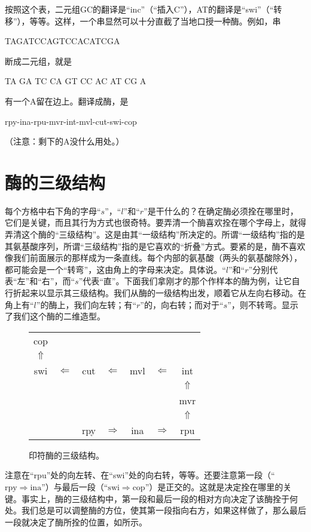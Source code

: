 按照这个表，二元组GC的翻译是“inc”（“插入C”），AT的翻译是“swi”（“转移”），等等。这样，一个串显然可以十分直截了当地口授一种酶。例如，串
\begin{center}
TAGATCCAGTCCACATCGA
\end{center}
断成二元组，就是
\begin{center}
TA GA TC CA GT CC AC AT CG A
\end{center}
有一个A留在边上。翻译成酶，是
\begin{center}
rpy-ina-rpu-mvr-int-mvl-cut-swi-cop
\end{center}
（注意：剩下的A没什么用处。）

\section{酶的三级结构}

每个方格中右下角的字母“$s$”，“$l$”和“$r$”是干什么的？在确定酶必须拴在哪里时，它们是关键，而且其行为方式也很奇特。要弄清一个酶喜欢拴在哪个字母上，就得弄清这个酶的“三级结构”。这是由其“一级结构”所决定的。所谓“一级结构”指的是其氨基酸序列，所谓“三级结构”指的是它喜欢的“折叠”方式。要紧的是，酶不喜欢像我们前面展示的那样成为一条直线。每个内部的氨基酸（两头的氨基酸除外），都可能会是一个“转弯”，这由角上的字母来决定。具体说。“$l$”和“$r$”分别代表“左”和“右”，而“$s$”代表“直”。下面我们拿刚才的那个作样本的酶为例，让它自行折起来以显示其三级结构。我们从酶的一级结构出发，顺着它从左向右移动。在角上有“$l$”的酶上，我们向左转；有“$r$”的，向右转；而对于“$s$”，则不转弯。显示了我们这个酶的二维造型。

\begin{figure}
\begin{tabular}{*7c}
cop\\
$\Uparrow$\\
swi & $\Leftarrow$ & cut & $\Leftarrow$ & mvl & $\Leftarrow$ & int\\
&&&&&& $\Uparrow$ \\
&&&&&& mvr \\
&&&&&& $\Uparrow$ \\
&& rpy & $\Rightarrow$ & ina & $\Rightarrow$ & rpu
\end{tabular}
\caption{印符酶的三级结构。}
\end{figure}

注意在“rpu”处的向左转、在“swi”处的向右转，等等。还要注意第一段（“$\mathrm{rpy}\Rightarrow\mathrm{ina}$”）与最后一段（“$\mathrm{swi}\Rightarrow\mathrm{cop}$”）是正交的。这就是决定拴在哪里的关键。事实上，酶的三级结构中，第一段和最后一段的相对方向决定了该酶拴于何处。我们总是可以调整酶的方位，使其第一段指向右方，如果这样做了，那么最后一段就决定了酶所拴的位置，如所示。

